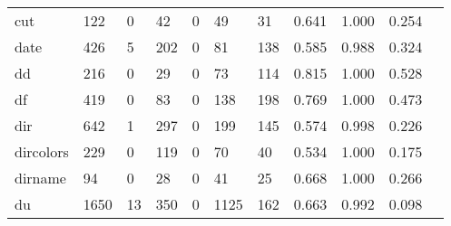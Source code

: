 \begin{longtable}{lp{1.10cm}p{1.10cm}p{1.10cm}p{1.10cm}p{1.10cm}p{1.10cm}p{1.10cm}p{1.10cm}p{1.10cm}p{1.10cm}}
cut       &                    122 &                                  0 &                                42 &                                0 &                                49 &                              31 &                          0.641 &                                 1.000 &                               0.254 \\
date      &                    426 &                                  5 &                               202 &                                0 &                                81 &                             138 &                          0.585 &                                 0.988 &                               0.324 \\
dd        &                    216 &                                  0 &                                29 &                                0 &                                73 &                             114 &                          0.815 &                                 1.000 &                               0.528 \\
df        &                    419 &                                  0 &                                83 &                                0 &                               138 &                             198 &                          0.769 &                                 1.000 &                               0.473 \\
dir       &                    642 &                                  1 &                               297 &                                0 &                               199 &                             145 &                          0.574 &                                 0.998 &                               0.226 \\
dircolors &                    229 &                                  0 &                               119 &                                0 &                                70 &                              40 &                          0.534 &                                 1.000 &                               0.175 \\
dirname   &                     94 &                                  0 &                                28 &                                0 &                                41 &                              25 &                          0.668 &                                 1.000 &                               0.266 \\
du        &                   1650 &                                 13 &                               350 &                                0 &                              1125 &                             162 &                          0.663 &                                 0.992 &                               0.098 \\

\end{longtable}
